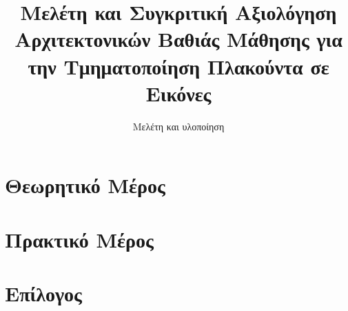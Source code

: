 \documentclass[modern,hyperref,watermark,histinit,noindex,plain,newlogo]{ntua-thesis}
\title{Μελέτη και Συγκριτική Αξιολόγηση Αρχιτεκτονικών Βαθιάς Μάθησης για την Τμηματοποίηση Πλακούντα σε Εικόνες \en{MRI}}
\subtitle{Μελέτη και υλοποίηση}
\begin{document}
\maketitle

\beginfrontmatter
\setcounter{page}{5}
	\cleardoublepage
	
	\cleardoublepage
	
	\cleardoublepage
	
	\cleardoublepage
	\tableofcontents
	\listofillustrations
	\listoftables
	

\beginmainmatter
	
	\part{Θεωρητικό Μέρος}
	
	
	
		\part{Πρακτικό Μέρος}
		
		
		\part{Επίλογος}
	
%	
%	
%  
%  
%  
		
	\printindices
%


	
%
\end{document}
